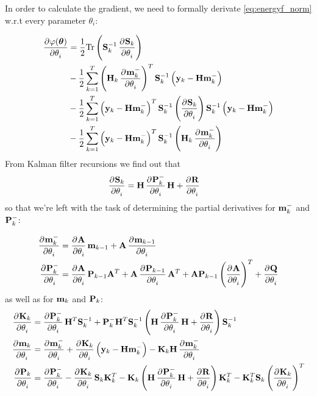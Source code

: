 \documentclass[12pt,a4paper,oneside,article]{memoir}
\begin{document}
In order to calculate the gradient, we need to formally derivate
\eqref{eq:energyf_norm} w.r.t every parameter $\theta_i$:

\begin{align}
	\dpd{\varphi(\gv{\theta})}{\theta_i}
	&=\frac{1}{2}\mathrm{Tr}\left(\v{S}_k^{-1}\dpd{\v{S}_k}{\theta_i}\right)\\
	&-\frac{1}{2}\sum_{k=1}^T\left(\v{H}_k\dpd{\v{m}^-_k}{\theta_i}\right)^T\v{S}_k^{-1}\left(\v{y}_k-\v{H}\v{m}_k^-\right)\\
	&-\frac{1}{2}\sum_{k=1}^T\left(\v{y}_k-\v{H}\v{m}_k^-\right)^T\v{S}_k^{-1}\left(\dpd{\v{S}_k}{\theta_i}\right)\v{S}_k^{-1}\left(\v{y}_k-\v{H}\v{m}_k^-\right)\\
	&-\frac{1}{2}\sum_{k=1}^T\left(\v{y}_k-\v{H}\v{m}_k^-\right)^T\v{S}_k^{-1}\left(\v{H}_k\dpd{\v{m}^-_k}{\theta_i}\right)\\
	\label{eq:energyf_d}
\end{align}
From Kalman filter recursions we find out that 
\begin{align}
	\dpd{\v{S}_k}{\theta_i}&=\v{H}\dpd{\v{P}_k^-}{\theta_i}\v{H}+\dpd{\v{R}}{\theta_i}
\end{align}
so that we're left with the task of determining the partial derivatives for
$\mathbf{m}^-_k$ and $\mathbf{P}_k^-$:

\begin{align}
	\dpd{\v{m}_k^-}{\theta_i}&=\dpd{\v{A}}{\theta_i}\v{m}_{k-1}+\v{A}\dpd{\v{m}_{k-1}}{\theta_i}\\
	\dpd{\v{P}_k^-}{\theta_i}&=\dpd{\v{A}}{\theta_i}\v{P}_{k-1}\v{A}^T+\v{A}\dpd{\v{P}_{k-1}}{\theta_i}\v{A}^T+\v{A}\v{P}_{k-1}\left(\dpd{\v{A}}{\theta_i}\right)^T+\dpd{\v{Q}}{\theta_i}
\end{align}
as well as for $\mathbf{m}_k$ and $\mathbf{P}_k$:
\begin{align}
	\dpd{\v{K}_k}{\theta_i}&=\dpd{\v{P}_k^-}{\theta_i}\v{H}^T\v{S}_k^{-1}+\v{P}_k^-\v{H}^T\v{S}_k^{-1}\left(\v{H}\dpd{\v{P}_k^-}{\theta_i}\v{H}+\dpd{\v{R}}{\theta_i}\right)\v{S}_k^{-1}\\
	\dpd{\v{m}_k}{\theta_i}&=\dpd{\v{m}_k^-}{\theta_i}+\dpd{\v{K}_k}{\theta_i}\left(\v{y}_k-\v{H}\v{m}_k^-\right)-\v{K}_k\v{H}\dpd{\v{m}_k^-}{\theta_i}\\
	\dpd{\v{P}_k}{\theta_i}&=\dpd{\v{P}_k^-}{\theta_i}-\dpd{\v{K}_k}{\theta_i}\v{S}_{k}\v{K}_{k}^T-\v{K}_{k}\left(\v{H}\dpd{\v{P}_k^-}{\theta_i}\v{H}+\dpd{\v{R}}{\theta_i}\right)\v{K}_{k}^T-\v{K}_{k}^T\v{S}_{k}\left(\dpd{\v{K}_k}{\theta_i}\right)^T
\end{align}
\end{document}
